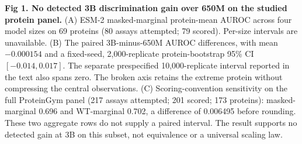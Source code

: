 \caption{{\bf Fig 1. No detected 3B discrimination gain over 650M on the studied protein panel.} (A) ESM-2 masked-marginal protein-mean AUROC across four model sizes on 69 proteins (80 assays attempted; 79 scored). Per-size intervals are unavailable. (B) The paired 3B-minus-650M AUROC differences, with mean $-0.000154$ and a fixed-seed, 2,000-replicate protein-bootstrap 95\% CI $[-0.014,0.017]$. The separate prespecified 10,000-replicate interval reported in the text also spans zero. The broken axis retains the extreme protein without compressing the central observations. (C) Scoring-convention sensitivity on the full ProteinGym panel (217 assays attempted; 201 scored; 173 proteins): masked-marginal 0.696 and WT-marginal 0.702, a difference of 0.006495 before rounding. These two aggregate rows do not supply a paired interval. The result supports no detected gain at 3B on this subset, not equivalence or a universal scaling law.}
